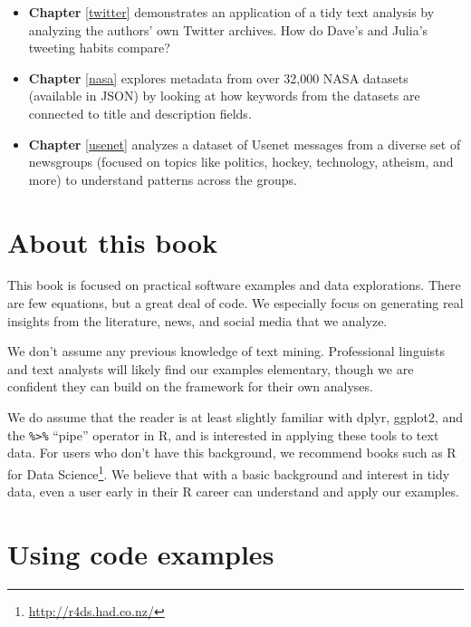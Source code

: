 \documentclass[
]{book}
\providecommand{\tightlist}{%
  \setlength{\itemsep}{0pt}\setlength{\parskip}{0pt}}
\DeclareRobustCommand{\href}[2]{#2\footnote{\url{#1}}}
\begin{document}
\begin{itemize}
\tightlist
\item
  \textbf{Chapter} \ref{twitter} demonstrates an application of a tidy text analysis by analyzing the authors' own Twitter archives. How do Dave's and Julia's tweeting habits compare?
\item
  \textbf{Chapter} \ref{nasa} explores metadata from over 32,000 NASA datasets (available in JSON) by looking at how keywords from the datasets are connected to title and description fields.
\item
  \textbf{Chapter} \ref{usenet} analyzes a dataset of Usenet messages from a diverse set of newsgroups (focused on topics like politics, hockey, technology, atheism, and more) to understand patterns across the groups.
\end{itemize}

\section*{About this book}\label{about-this-book}

This book is focused on practical software examples and data explorations. There are few equations, but a great deal of code. We especially focus on generating real insights from the literature, news, and social media that we analyze.

We don't assume any previous knowledge of text mining. Professional linguists and text analysts will likely find our examples elementary, though we are confident they can build on the framework for their own analyses.

We do assume that the reader is at least slightly familiar with dplyr, ggplot2, and the \texttt{\%\textgreater{}\%} ``pipe'' operator in R, and is interested in applying these tools to text data. For users who don't have this background, we recommend books such as \href{http://r4ds.had.co.nz/}{R for Data Science}. We believe that with a basic background and interest in tidy data, even a user early in their R career can understand and apply our examples.

\section*{Using code examples}\label{using-code-examples}
\end{document}
